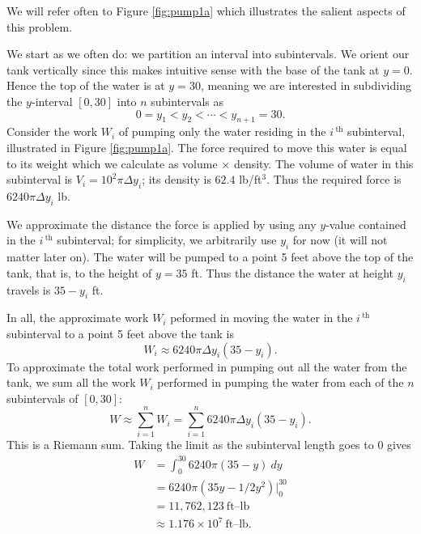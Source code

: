 {We will refer often to Figure \ref{fig:pump1a} which illustrates the salient aspects of this problem.

We start as we often do: we partition an interval into subintervals. We orient our tank vertically since this makes intuitive sense with the base of the tank at $y=0$. Hence the top of the water is at $y=30$, meaning we are interested in subdividing the $y$-interval $[0,30]$ into $n$ subintervals as 
$$0 = y_1 < y_2 < \cdots < y_{n+1} = 30.$$
Consider the work $W_i$ of pumping only the water residing in the $i\,^\text{th}$ subinterval, illustrated in Figure \ref{fig:pump1a}. The force required to move this water is equal to its weight which we calculate as volume $\times $ density. The volume of water in this subinterval is 
$V_i = 10^2\pi \Delta y_i$; its density is $62.4$ lb/ft$^3$. Thus the required force is $6240\pi\Delta y_i$ lb.

We approximate the distance the force is applied by using any $y$-value contained in the $i\,^\text{th}$ subinterval; for simplicity, we arbitrarily use $y_i$ for now (it will not matter later on). The water will be pumped to a point 5 feet above the top of the tank, that is, to the height of $y=35$ ft. Thus the distance the water at height $y_i$ travels is $35-y_i$ ft. 

In all, the approximate work $W_i$ peformed in moving the water in the $i\,^\text{th}$ subinterval to a point 5 feet above the tank is 
$$W_i \approx 6240\pi\Delta y_i(35-y_i).$$
To approximate the total work performed in pumping out all the water from the tank, we sum all the work $W_i$ performed in pumping the water from each of the $n$ subintervals of $[0,30]$:
$$W \approx \sum_{i=1}^n W_i = \sum_{i=1}^n 6240\pi\Delta y_i(35-y_i).$$
This is a Riemann sum. Taking the limit as the subinterval length goes to 0 gives 
\begin{align*}
W 	&=	\int_0^{30} 6240\pi(35-y)\ dy \\
		&=  6240\pi\left(35y-1/2y^2\right)\Big|_0^{30} \\
		&= 	11,762,123 \ \text{ft--lb}\\
		&\approx  1.176 \times 10^7 \ \text{ft--lb}.
\end{align*}
\baselineskip
}\\
\clearpage

